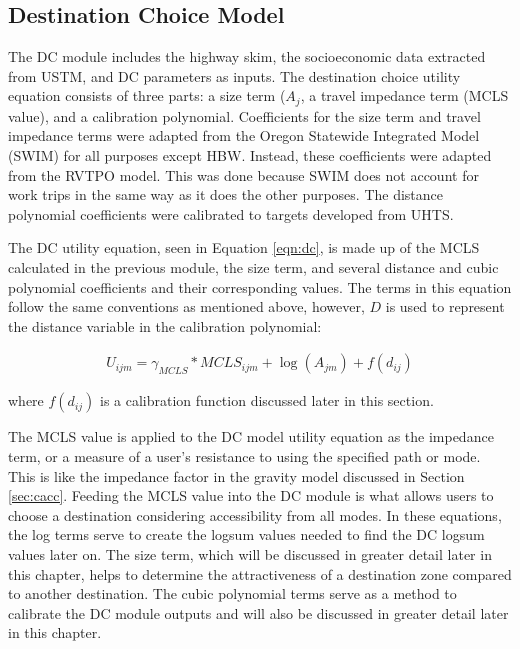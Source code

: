 \subsection{Destination Choice Model}
\label{sec:dc}
The DC module
includes the highway skim, the socioeconomic data extracted
from USTM, and DC parameters as inputs.
The destination choice utility equation consists of three parts: a size term (\(A_j\),
a travel impedance term (MCLS value), and a calibration polynomial. Coefficients for the
size term and travel impedance terms were adapted from the Oregon
Statewide Integrated Model (SWIM) for all purposes except HBW. Instead, these coefficients were
adapted from the RVTPO model. This was done because SWIM does not account for work trips in the same way as it does the other purposes. The distance polynomial coefficients were
calibrated to targets developed from UHTS.

The DC utility equation, seen in Equation \ref{eqn:dc}, is made up of the
MCLS calculated in the previous module, the size term, and several distance and cubic polynomial
coefficients and their corresponding values. The terms in this equation follow the same conventions as mentioned
above, however, \(D\) is used to represent the distance variable in the calibration polynomial:

\begin{equation}
\begin{aligned}
	U_{ijm} = \gamma_{MCLS} * MCLS_{ijm} + \log (A_{jm}) + f(d_{ij})
\label{eqn:dc}
\end{aligned}
\end{equation}

\noindent where $f(d_{ij})$ is a calibration function discussed later in this section.

The MCLS value is applied to the DC model utility equation as the impedance
term, or a measure of
a user’s resistance to using the specified path or mode. This is like the
impedance factor in the
gravity model discussed in Section \ref{sec:cacc}. Feeding the MCLS value into
the DC module is what allows
users to choose a destination considering accessibility from all modes. In these
equations, the log terms serve to create the logsum values needed to find
the DC logsum values later on.
The size term, which
will be discussed in greater detail later in this chapter, helps to determine
the attractiveness
of a destination zone compared to another destination. The cubic polynomial
terms serve as a
method to calibrate the DC module outputs and will also be discussed in
greater detail later in
this chapter.

